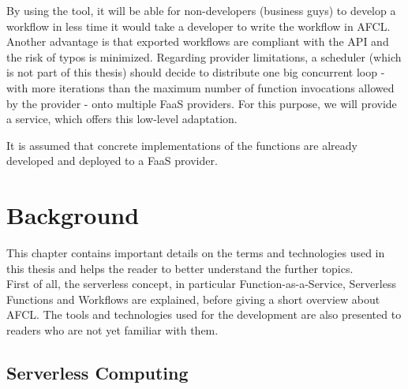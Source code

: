 \documentclass[a4paper,12pt,pdftex,halfparskip,cleardoubleempty,bibtotoc,liststotoc]{scrbook}
\begin{document}
By using the tool, it will be able for non-developers (business guys) to develop a workflow in less time it would take a developer to write the workflow in AFCL.
Another advantage is that exported workflows are compliant with the API and the risk of typos is minimized.
Regarding provider limitations, a scheduler (which is not part of this thesis) should decide to distribute one big concurrent loop - with more iterations than the maximum number of function invocations allowed by the provider - onto multiple FaaS providers. For this purpose, we will provide a service, which offers this low-level adaptation.


It is assumed that concrete implementations of the functions are already developed and deployed to a FaaS provider.



\chapter{Background}

This chapter contains important details on the terms and technologies used in this thesis and helps the reader to better understand the further topics.\\
First of all, the serverless concept, in particular Function-as-a-Service, Serverless Functions and Workflows are explained, before giving a short overview about AFCL. The tools and technologies used for the development are also presented to readers who are not yet familiar with them.

\section{Serverless Computing}
\end{document}
